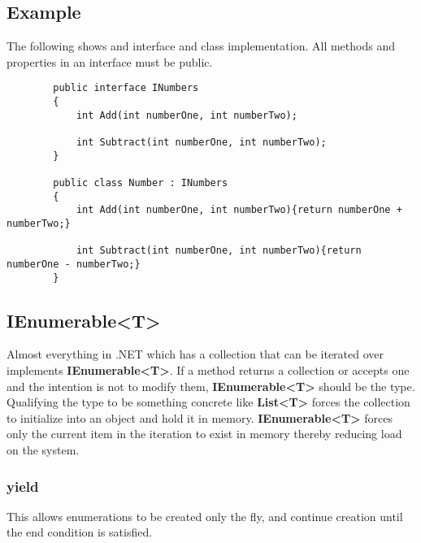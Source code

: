 \documentclass {amsart}
\begin{document}
	\subsection{Example}  The following shows and interface and class implementation.  All methods and properties in an interface must be public. 

	\begin{lstlisting}
		public interface INumbers
		{
			int Add(int numberOne, int numberTwo);

			int Subtract(int numberOne, int numberTwo);
		}

		public class Number : INumbers
		{
			int Add(int numberOne, int numberTwo){return numberOne + numberTwo;}

			int Subtract(int numberOne, int numberTwo){return numberOne - numberTwo;}
		}

	\end{lstlisting}


	\subsection{IEnumerable\textless T\textgreater}  Almost everything in .NET which has a collection that can be iterated over implements {\bf IEnumerable\textless T\textgreater}.  If a method returns a collection or accepts one and the intention is not to modify them, {\bf IEnumerable\textless T\textgreater} should be the type.  Qualifying the type to be something concrete like {\bf List\textless T\textgreater} forces the collection to initialize into an object and hold it in memory.  {\bf IEnumerable\textless T\textgreater} forces only the current item in the iteration to exist in memory thereby reducing load on the system.  



		\subsubsection {yield}  This allows enumerations to be created only the fly, and continue creation until the end condition is satisfied.
\end{document}
